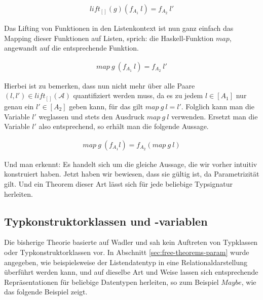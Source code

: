 \begin{align*}
lift_{[]}(g) (f_{A_1}\ l) = f_{A_2}\ l'
\end{align*}

Das Lifting von Funktionen in den Listenkontext ist nun ganz einfach das Mapping dieser Funktionen auf Listen, sprich: die Haskell-Funktion
$map$, angewandt auf die entsprechende Funktion.

\begin{align*}
map\ g\ (f_{A_1}\ l) = f_{A_2}\ l'
\end{align*}

Hierbei ist zu bemerken, dass nun nicht mehr über alle Paare $(l, l') \in lift_{[]}(\mathcal{A})$
quantifiziert werden muss, da es zu jedem $l \in [A_1]$ nur genau ein $l' \in [A_2]$ geben kann, für das gilt $map\ g\ l = l'$. Folglich kann man die Variable $l'$
weglassen und stets den Ausdruck $map\ g\ l$ verwenden.
Ersetzt man die Variable $l'$ also entsprechend, so erhält man die folgende Aussage.

\begin{align*}
map\ g\ (f_{A_1} l) = f_{A_2} (map\ g\ l)
\end{align*}

Und man erkennt: Es handelt sich um die gleiche Aussage, die wir vorher intuitiv konstruiert haben. Jetzt haben wir bewiesen,
dass sie gültig ist, da Parametrizität gilt. Und ein Theorem dieser Art lässt sich für jede beliebige Typsignatur herleiten.


\subsection{Typkonstruktorklassen und -variablen}

\label{sec:typkonstruktorklassen}

Die bisherige Theorie basierte auf Wadler \cite{wadler} und sah kein Auftreten von Typklassen oder Typkonstruktorklassen vor.
In Abschnitt \ref{sec:free-theorems-param} wurde angegeben, wie beispielsweise der Listendatentyp in eine Relationaldarstellung
überführt werden kann, und auf dieselbe Art und Weise lassen sich entsprechende Repräsentationen für beliebige Datentypen
herleiten, so zum Beispiel $Maybe$, wie das folgende Beispiel zeigt.

